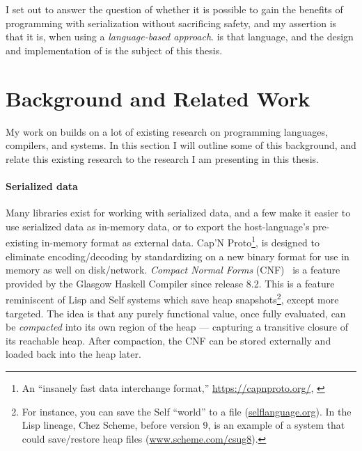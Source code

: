 I set out to answer the question of whether it is possible to gain the benefits
of programming with serialization without sacrificing safety, and my assertion
is that it is, when using a \emph{language-based approach}. \ourcalc{} is that
language, and the design and implementation of \ourcalc{} is the subject of this
thesis.

\section{Background and Related Work}\label{sec:bg}

My work on \ourcalc{} builds on a lot of existing research on programming languages,
compilers, and systems. In this section I will outline some of this background, and
relate this existing research to the research I am presenting in this thesis.

\paragraph{Serialized data}

Many libraries exist for working with serialized data, and a few
make it easier to use serialized data as in-memory data, or to export the
host-language's pre-existing in-memory format as external data.
Cap'N Proto\footnote{An ``insanely fast data interchange format,''
  \url{https://capnproto.org/}, \cite{capnproto}},
is designed to eliminate encoding/decoding by
standardizing on a new binary format for use in memory as well on disk/network.
%
%
{\em Compact Normal Forms} (CNF)~\cite{cnf-icfp15} is
a feature provided by the Glasgow Haskell Compiler since release 8.2.
%
This is a
feature reminiscent of Lisp and Self systems which save heap snapshots\footnote{For
  instance, you can save the Self ``world'' to a  file (\url{selflanguage.org}).  In the Lisp lineage, Chez
  Scheme, before version 9, is an example of a system that could save/restore heap
  files (\url{www.scheme.com/csug8}).},
%
except more targeted.
%
The idea is that any purely functional value, once fully evaluated, can be {\em compacted}
into its own region of the heap
--- capturing a transitive closure of its reachable heap.
After compaction, the CNF can be stored externally and loaded
back into the heap later.

